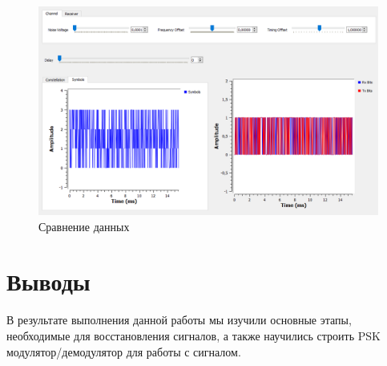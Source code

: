 \documentclass[a4paper, 14pt]{extarticle}
\begin{document}
    \begin{figure}[H]
        \centering
        \includegraphics[width=0.8\linewidth]{decoder}
        \caption{Сравнение данных}
        \label{fig:decoder}
    \end{figure}

    \newpage


    \section{Выводы}
    \label{sec:conclusions}

    В результате выполнения данной работы мы изучили основные этапы, необходимые для восстановления сигналов, а также научились строить PSK модулятор/демодулятор для работы с сигналом.
\end{document}
